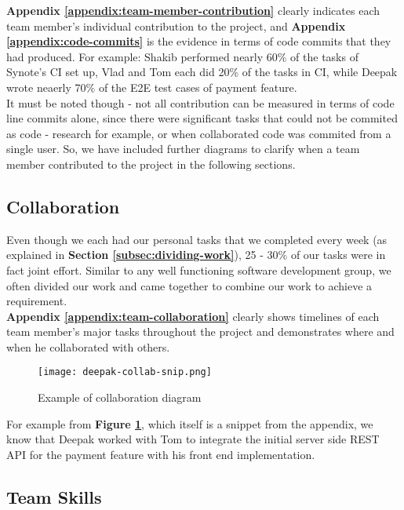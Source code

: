 \textbf{Appendix \ref{appendix:team-member-contribution}} clearly indicates each team member's individual contribution to the project, and \textbf{Appendix \ref{appendix:code-commits}} is the evidence in terms of code commits that they had produced. For example: Shakib performed nearly 60\% of the tasks of Synote's CI set up, Vlad and Tom each did 20\% of the tasks in CI, while Deepak wrote neaerly 70\% of the E2E test cases of payment feature.\\

It must be noted though - not all contribution can be measured in terms of code line commits alone, since there were significant tasks that could not be commited as code - research for example, or when collaborated code was commited from a single user. So, we have included further diagrams to clarify when a team member contributed to the project in the following sections. \\

\subsection{Collaboration}
\label{subsec:collaboration}

Even though we each had our personal tasks that we completed every week (as explained in \textbf{Section \ref{subsec:dividing-work}}), 25 - 30\% of our tasks were in fact joint effort. Similar to any well functioning software development group, we often divided our work and came together to combine our work to achieve a requirement.\\

\textbf{Appendix \ref{appendix:team-collaboration}} clearly shows timelines of each team member's major tasks throughout the project and demonstrates where and when he collaborated with others.\\

\begin{figure}[!hbt]
  	\centering
 	\texttt{[image: deepak-collab-snip.png]}
  	\caption{Example of collaboration diagram}
 	\label{fig:deepak-collaboration-snippet}
\end{figure}

For example from \textbf{Figure \ref{fig:deepak-collaboration-snippet}}, which itself is a snippet from the appendix, we know that Deepak worked with Tom to integrate the initial server side REST API for the payment feature with his front end implementation.

\subsection{Team Skills}
\label{subsec:team-skills}

